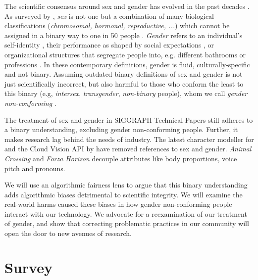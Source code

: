 \documentclass[sigconf,balance=false]{acmart}
\begin{document}





The scientific consensus around sex and gender has evolved in the past decades \cite{pmid30377332}. As surveyed by \citet{fausto2012sex}, \emph{sex} is not one but a combination of many biological classifications (\emph{chromosomal, hormonal, reproductive, ...}) which cannot be assigned in a binary way to one in 50 people \cite{blackless2000sexually}.
\emph{Gender} refers to an individual's self-identity \cite{money1972man}, their performance as shaped by social expectations \cite{butler2003gender}, or organizational structures that segregate people into, e.g. different bathrooms or professions \cite{lorber1994paradoxes}. In these contemporary definitions, gender is fluid, culturally-specific and not binary. Assuming outdated binary definitions of sex and gender is not just scientifically incorrect, but also harmful to those who conform the least to this binary (e.g, \emph{intersex}, \emph{transgender}, \emph{non-binary} people), whom we call \emph{gender non-conforming} \cite{un2015report}.

The treatment of sex and gender in SIGGRAPH Technical Papers
still adheres to a binary understanding, excluding gender non-conforming people. Further, it makes research lag behind the needs of industry. The latest character modeller for \citet{metahuman} and the Cloud Vision API by \citet{googlegender} have removed references to sex and gender. \emph{Animal Crossing} and \emph{Forza Horizon} decouple attributes like body proportions, voice pitch and pronouns. 

We will use an algorithmic fairness lens to argue that this binary understanding adds algorithmic biases detrimental to scientific integrity.
We will examine the real-world harms caused these biases in how gender non-conforming people interact with
our technology. We advocate for a reexamination of our treatment of gender, and show that correcting problematic practices in
our community will open the door to new avenues of research.

\section{Survey}
\end{document}
